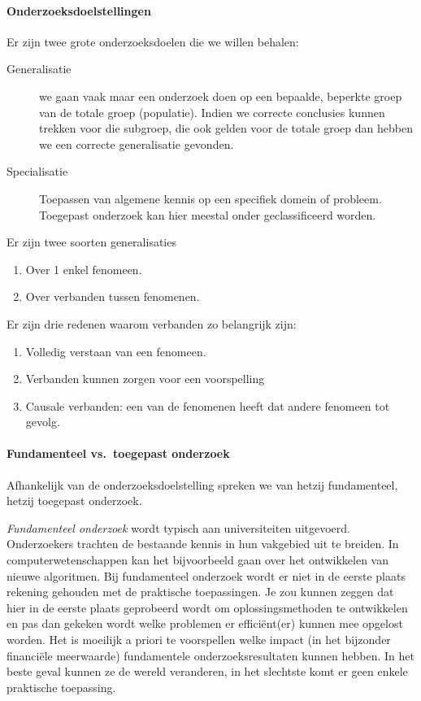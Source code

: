 \paragraph{Onderzoeksdoelstellingen}

Er zijn twee grote onderzoeksdoelen die we willen behalen:

\begin{description}
  \item [Generalisatie] we gaan vaak maar een onderzoek doen op een bepaalde, beperkte groep van de totale groep (populatie). Indien we correcte conclusies kunnen trekken voor die subgroep, die ook gelden voor de totale groep dan hebben we een correcte generalisatie gevonden.
  \item[Specialisatie] Toepassen van algemene kennis op een specifiek domein of probleem. Toegepast onderzoek kan hier meestal onder geclassificeerd worden.
\end{description}

Er zijn twee soorten generalisaties
\begin{enumerate}
	\item Over 1 enkel fenomeen.
	\item Over verbanden tussen fenomenen.
\end{enumerate}
Er zijn drie redenen waarom verbanden zo belangrijk zijn:
\begin{enumerate}
	\item Volledig verstaan van een fenomeen. 
	\item Verbanden kunnen zorgen voor een voorspelling
	\item Causale verbanden: een van de fenomenen heeft dat andere fenomeen tot gevolg. 
\end{enumerate}

\paragraph{Fundamenteel vs.~toegepast onderzoek}

Afhankelijk van de onderzoeksdoelstelling spreken we van hetzij fundamenteel, hetzij toegepast onderzoek.

\emph{Fundamenteel onderzoek} wordt typisch aan universiteiten uitgevoerd. Onderzoekers trachten de bestaande kennis in hun vakgebied uit te breiden. In computerwetenschappen kan het bijvoorbeeld gaan over het ontwikkelen van nieuwe algoritmen. Bij fundamenteel onderzoek wordt er niet in de eerste plaats rekening gehouden met de praktische toepassingen. Je zou kunnen zeggen dat hier in de eerste plaats geprobeerd wordt om oplossingsmethoden te ontwikkelen en pas dan gekeken wordt welke problemen er efficiënt(er) kunnen mee opgelost worden. Het is moeilijk a priori te voorspellen welke impact (in het bijzonder financiële meerwaarde) fundamentele onderzoeksresultaten kunnen hebben. In het beste geval kunnen ze de wereld veranderen, in het slechtste komt er geen enkele praktische toepassing.

